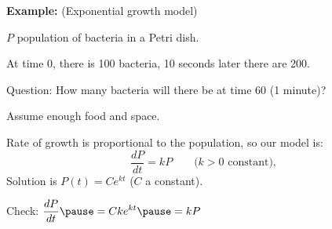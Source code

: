 \documentclass[10pt,aspectratio=169]{beamer}
\begin{document}
\begin{frame}
\textbf{Example:} (Exponential growth model)

\medskip
\pause

$P$ population of bacteria in a Petri dish.

\medskip
\pause

At time 0, there is 100 bacteria, 10 seconds later there are 200.

\pause

Question: How many bacteria will there be at time 60 (1 minute)?

\medskip
\pause

Assume enough food and space.

\medskip
\pause

Rate of growth is proportional to the population, so our model is:
\pause
\[
\frac{dP}{dt} = kP \qquad \text{($k > 0$ constant)},
\]
\pause
Solution is \quad $P(t) = C e^{kt}$ \quad ($C$ a constant).

\medskip
\pause

Check: 
\quad
$\displaystyle
\frac{dP}{dt} \pause = C k e^{kt} \pause = k P$ \pause \quad {\Large\checkmark}

\end{frame}
\end{document}
